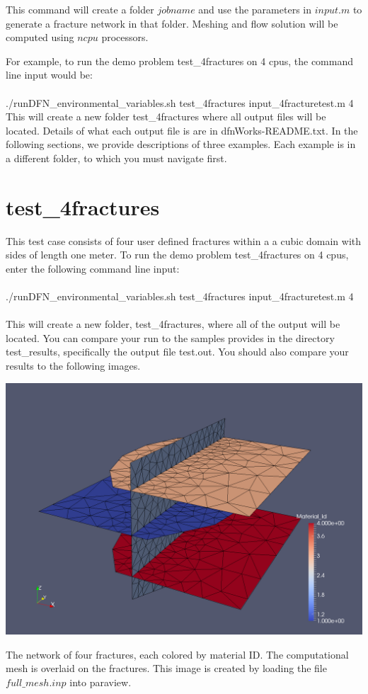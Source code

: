 \documentclass{article}
\begin{document}
\noindent This command will create a folder $jobname$ and use the parameters in $input.m$ to generate a fracture network in that folder. Meshing and flow solution will be computed using $ncpu$ processors. 

For example, to run the demo problem test\_4fractures on 4 cpus, the command line input would be:\\\\
 ./runDFN\_environmental\_variables.sh test\_4fractures input\_4fracturetest.m 4\\

This will create a new folder test\_4fractures where all output files will be located. 
Details of what each output file is are in dfnWorks-README.txt.   In the following sections, we provide descriptions of three examples. Each example is in a different folder, to which you must navigate first.

\section{test\_4fractures}

This test case consists of four user defined fractures within a a cubic domain with sides of length one meter. 
To run the demo problem test\_4fractures on 4 cpus, enter the following command line input:\\\\
 ./runDFN\_environmental\_variables.sh test\_4fractures input\_4fracturetest.m 4\\\\
 This will create a new folder, test\_4fractures, where all of the output will be located. 
You can compare your run to the samples provides in the directory test\_results, specifically the output file test.out.
You should also compare your results to the following images. 

\begin{center}
\includegraphics[width=0.75\linewidth]{figs/test_4_fracture_mesh.png}\\
\end{center}
The network of four fractures, each colored by material ID. 
The computational mesh is overlaid on the fractures. 
This image is created by loading the file $full\_mesh.inp$ into paraview. 
\end{document}
